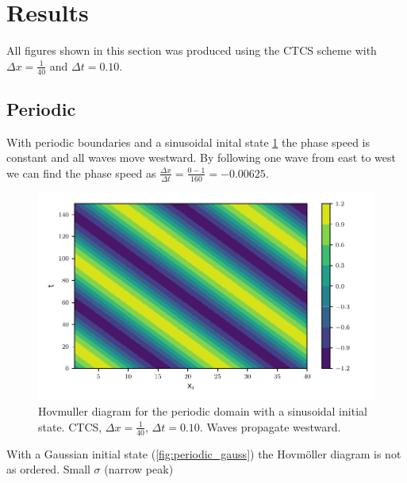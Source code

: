 \newpage
\section{Results}


All figures shown in this section was produced using the CTCS scheme with
$\Delta x = \frac{1}{40} $ and $\Delta t = 0.10$.

\subsection{Periodic}

With periodic boundaries and a sinusoidal inital state \cref{fig:periodic_sine}
the phase speed is constant and all waves move westward. By following one wave
from east to west we can find the phase speed as $\frac{\Delta x}{\Delta t} =
\frac{0-1}{160} = -0.00625$.

\begin{figure}[htp]
  \centering
  \includegraphics[width=\textwidth]{../figures/psi_periodic_centered_short.pdf}
  \caption{Hovmuller diagram for the periodic domain with a sinusoidal initial state. CTCS, $\Delta x = \frac{1}{40}$, $\Delta t = 0.10$. Waves propagate westward.}
  \label{fig:periodic_sine}
\end{figure}

With a Gaussian initial state (\cref{fig:periodic_gauss}) the Hovmöller diagram is not as ordered. Small $\sigma$ (narrow peak)


